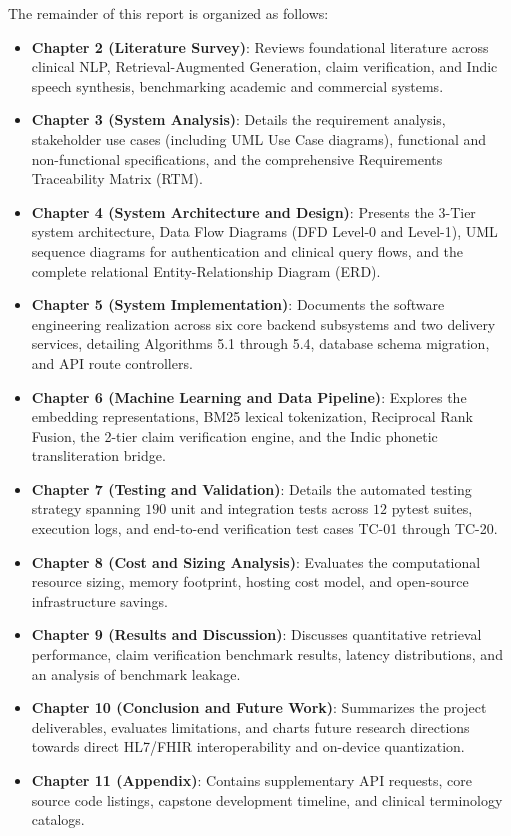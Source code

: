 The remainder of this report is organized as follows:
\begin{itemize}
    \item \textbf{Chapter 2 (Literature Survey)}: Reviews foundational literature across clinical NLP, Retrieval-Augmented Generation, claim verification, and Indic speech synthesis, benchmarking academic and commercial systems.
    \item \textbf{Chapter 3 (System Analysis)}: Details the requirement analysis, stakeholder use cases (including UML Use Case diagrams), functional and non-functional specifications, and the comprehensive Requirements Traceability Matrix (RTM).
    \item \textbf{Chapter 4 (System Architecture and Design)}: Presents the 3-Tier system architecture, Data Flow Diagrams (DFD Level-0 and Level-1), UML sequence diagrams for authentication and clinical query flows, and the complete relational Entity-Relationship Diagram (ERD).
    \item \textbf{Chapter 5 (System Implementation)}: Documents the software engineering realization across six core backend subsystems and two delivery services, detailing Algorithms 5.1 through 5.4, database schema migration, and API route controllers.
    \item \textbf{Chapter 6 (Machine Learning and Data Pipeline)}: Explores the embedding representations, BM25 lexical tokenization, Reciprocal Rank Fusion, the 2-tier claim verification engine, and the Indic phonetic transliteration bridge.
    \item \textbf{Chapter 7 (Testing and Validation)}: Details the automated testing strategy spanning $190$ unit and integration tests across $12$ pytest suites, execution logs, and end-to-end verification test cases TC-01 through TC-20.
    \item \textbf{Chapter 8 (Cost and Sizing Analysis)}: Evaluates the computational resource sizing, memory footprint, hosting cost model, and open-source infrastructure savings.
    \item \textbf{Chapter 9 (Results and Discussion)}: Discusses quantitative retrieval performance, claim verification benchmark results, latency distributions, and an analysis of benchmark leakage.
    \item \textbf{Chapter 10 (Conclusion and Future Work)}: Summarizes the project deliverables, evaluates limitations, and charts future research directions towards direct HL7/FHIR interoperability and on-device quantization.
    \item \textbf{Chapter 11 (Appendix)}: Contains supplementary API requests, core source code listings, capstone development timeline, and clinical terminology catalogs.
\end{itemize}

\newpage
